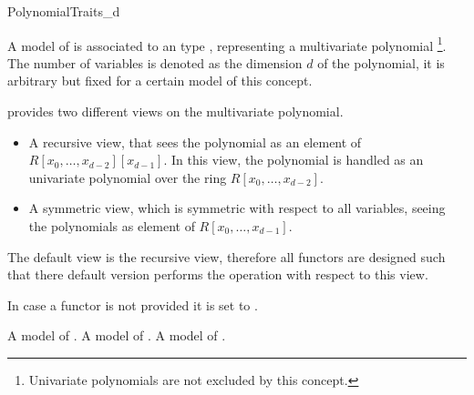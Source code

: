 \begin{ccRefConcept}{PolynomialTraits_d}

\ccDefinition
A model of  is associated to an type 
, representing a multivariate polynomial
\footnote{Univariate polynomials are not excluded by this concept.}. 
The number of variables is denoted as the dimension $d$ of the polynomial,
it is arbitrary but fixed for a certain model of this concept.  

 provides two different views on the 
multivariate polynomial. 

\begin{itemize}
\item A recursive view, that sees the polynomial as an element of 
$R[x_0,\dots,x_{d-2}][x_{d-1}]$. In this view, the polynomial is handled as
an univariate polynomial over the ring $R[x_0,\dots,x_{d-2}]$. 
\item A symmetric view, which is symmetric with respect to all variables,
seeing the polynomials as element of $R[x_0,\dots,x_{d-1}]$.
\end{itemize}


The default view is the recursive view, therefore all functors are 
designed such that there default version performs the operation 
with respect to this view. 

\ccRefines

\ccConstants
 

\ccTypes

\ccGlue
{}\ccGlue
{}


In case a functor is not provided it is set to .

        {A model of .}
        {A model of .}
        {A model of .}


\end{ccRefConcept}
